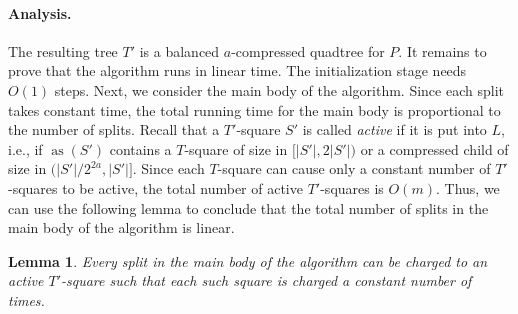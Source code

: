 \documentclass[11pt]{paper}
\DeclareMathOperator {\as}{as}
\newtheorem {lem}[theorem] {Lemma}
\begin{document}
      \paragraph{Analysis.}
      The resulting tree $T'$ is a balanced $a$-compressed quadtree
      for $P$. It remains to prove that the algorithm runs in linear time.
      The initialization stage needs $O(1)$ steps.
      Next, we consider the main body of the algorithm.
      Since each split takes constant time, the total running time 
      for the main body is proportional to the number of 
      splits. Recall that a $T'$-square $S'$ is called \emph{active} if 
      it is put into $L$, i.e., if $\as(S')$ contains a $T$-square of
      size in $[|S'|, 2|S'|)$ or a compressed child of size
      in $(|S'|/2^{2a}, |S'|]$. Since each $T$-square can cause only
      a constant number of $T'$-squares to be active, the total 
      number of active $T'$-squares is $O(m)$. Thus, we can use the following 
      lemma to conclude that the total number of
      splits in the main body of the algorithm is linear.
      
      \begin{lem}\label{lem:main-body}
         Every split in the main body of the algorithm can be charged
	 to an active $T'$-square such that each such square
	 is charged a constant number of times.
      \end{lem}
\end{document}
